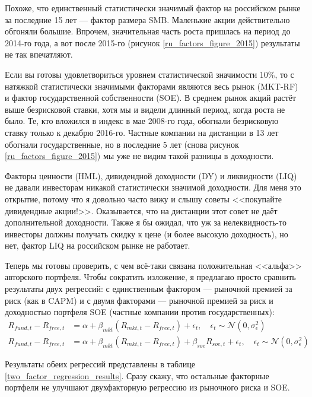 Похоже, что единственный статистически значимый фактор на российском рынке за 
последние 15 лет --- фактор размера SMB. Маленькие акции действительно обгоняли 
большие. Впрочем, значительная часть роста пришлась на период до 2014-го года, а 
вот после 2015-го (рисунок \ref{ru_factors_figure_2015}) результаты не так 
впечатляют.

Если вы готовы удовлетвориться уровнем статистической значимости 10\%, то с 
натяжкой статистически значимыми факторами являются весь рынок (MKT-RF) и фактор 
государственной собственности (SOE). В среднем рынок акций растёт выше 
безрисковой ставки, хотя мы и видели длинный период, когда роста не было. Те, 
кто вложился в индекс в мае 2008-го года, обогнали безрисковую ставку только к 
декабрю 2016-го. Частные компании на дистанции в 13 лет обогнали 
государственные, но в последние 5 лет (снова рисунок 
\ref{ru_factors_figure_2015}) мы уже не видим такой разницы в доходности.

Факторы ценности (HML), дивидендной доходности (DY) и ликвидности (LIQ) не 
давали инвесторам никакой статистически значимой доходности. Для меня это 
открытие, потому что я довольно часто вижу и слышу советы <<покупайте 
дивидендные акции!>>. Оказывается, что на дистанции этот совет не даёт 
дополнительной доходности. Также я бы ожидал, что уж за нелеквидность-то 
инвесторы должны получать скидку к цене (и более высокую доходность), но нет, 
фактор LIQ на российском рынке не работает.

Теперь мы готовы проверить, с чем всё-таки связана положительная <<альфа>> 
авторского портфеля. Чтобы сократить изложение, я предлагаю просто сравнить 
результаты двух регрессий: с единственным фактором --- рыночной премией за риск 
(как в CAPM) и с двумя факторами --- рыночной премией за риск и доходностью 
портфеля SOE (частные компании против государственных):
\begin{align*}
R_{fund,t} - R_{free,t} &=
\alpha + \beta_{mkt}(R_{mkt,t} - R_{free,t}) + \epsilon_t,
\quad
\epsilon_t \sim \mathcal{N}(0, \sigma_{\epsilon}^2) \\
R_{fund,t} - R_{free,t} &= \alpha 
+ \beta_{mkt}(R_{mkt,t} - R_{free,t}) + \beta_{soe}R_{soe,t} + \epsilon_t,
\quad
\epsilon_t \sim \mathcal{N}(0, \sigma_{\epsilon}^2)
\end{align*}

Результаты обеих регрессий представлены в таблице 
\ref{two_factor_regression_results}. Сразу скажу, что остальные факторные 
портфели не улучшают двухфакторную регрессию из рыночного риска и SOE.

